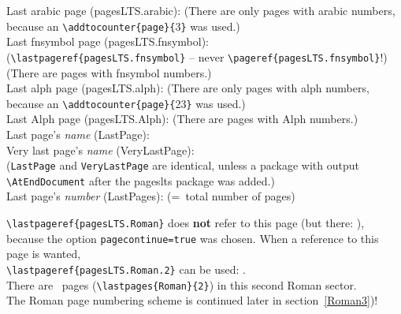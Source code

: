 \documentclass[british]{article}
\def\pagesLTSexampleArabic{3}
\def\pagesLTSexamplealph{23}
\begin{document}
\noindent Last arabic page (pagesLTS.arabic): 
(There are only  pages with arabic numbers,
because an \verb|\addtocounter{page}{|\pagesLTSexampleArabic\verb|}| was used.)\\

\noindent Last fnsymbol page (pagesLTS.fnsymbol):  \\
(\verb|\lastpageref{pagesLTS.fnsymbol}| -- never
\verb|\pageref{pagesLTS.fnsymbol}|!)\\
(There are  pages with fnsymbol numbers.)\\

\noindent Last alph page (pagesLTS.alph): 
(There are only  pages with alph numbers,
because an \verb|\addtocounter{page}{|\pagesLTSexamplealph\verb|}| was used.)\\

\noindent Last Alph page (pagesLTS.Alph): 
(There are  pages with Alph numbers.)\\

\noindent Last page's \textit{name} (LastPage): \\

\noindent Very last page's \textit{name} (VeryLastPage): \\
(\texttt{LastPage} and \texttt{VeryLastPage} are identical, unless
a package with output \linebreak
\verb|\AtEndDocument| after the \textsf{pageslts} package was added.)\\

\noindent Last page's \textit{number} (LastPages): 
(=~total number of pages)\\

\lipsum[1-6]

\newpage

\verb|\lastpageref{pagesLTS.Roman}| does \textbf{not}
refer to this page (but there: ),
because the option \texttt{pagecontinue=true}
was chosen. When a reference to this page is wanted,\\
\verb|\lastpageref{pagesLTS.Roman.2}| can be used: .\\

\bigskip
There are ~pages (\verb|\lastpages{Roman}{2}|) in this
second Roman sector.\\
The Roman page numbering scheme is continued later in section~\ref{Roman3})!
\end{document}
